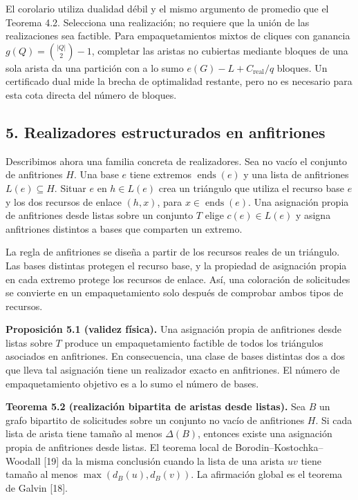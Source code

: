 \documentclass[spanish,11pt,a4paper]{article}
\begin{document}
El corolario utiliza dualidad débil y el mismo argumento de promedio que
el Teorema 4.2. Selecciona una realización; no requiere que la unión de
las realizaciones sea factible. Para empaquetamientos mixtos de cliques
con ganancia \(g(Q)=\binom{|Q|}{2}-1\), completar las aristas no
cubiertas mediante bloques de una sola arista da una partición con a lo
sumo \(e(G)-L+C_{\mathrm{real}}/q\) bloques. Un certificado dual mide la
brecha de optimalidad restante, pero no es necesario para esta cota
directa del número de bloques.

\subsection{5. Realizadores estructurados en
anfitriones}\label{realizadores-estructurados-en-anfitriones}

Describimos ahora una familia concreta de realizadores. Sea no vacío el
conjunto de anfitriones \(H\). Una base \(e\) tiene extremos
\(\operatorname{ends}(e)\) y una lista de anfitriones
\(L(e)\subseteq H\). Situar \(e\) en \(h\in L(e)\) crea un triángulo que
utiliza el recurso base \(e\) y los dos recursos de enlace \((h,x)\),
para \(x\in\operatorname{ends}(e)\). Una asignación propia de
anfitriones desde listas sobre un conjunto \(T\) elige \(c(e)\in L(e)\)
y asigna anfitriones distintos a bases que comparten un extremo.

La regla de anfitriones se diseña a partir de los recursos reales de un
triángulo. Las bases distintas protegen el recurso base, y la propiedad
de asignación propia en cada extremo protege los recursos de enlace.
Así, una coloración de solicitudes se convierte en un empaquetamiento
solo después de comprobar ambos tipos de recursos.

\textbf{Proposición 5.1 (validez física).} Una asignación propia de
anfitriones desde listas sobre \(T\) produce un empaquetamiento factible
de todos los triángulos asociados en anfitriones. En consecuencia, una
clase de bases distintas dos a dos que lleva tal asignación tiene un
realizador exacto en anfitriones. El número de empaquetamiento objetivo
es a lo sumo el número de bases.

\textbf{Teorema 5.2 (realización bipartita de aristas desde listas).}
Sea \(B\) un grafo bipartito de solicitudes sobre un conjunto no vacío
de anfitriones \(H\). Si cada lista de arista tiene tamaño al menos
\(\Delta(B)\), entonces existe una asignación propia de anfitriones
desde listas. El teorema local de Borodin--Kostochka--Woodall {[}19{]}
da la misma conclusión cuando la lista de una arista \(uv\) tiene tamaño
al menos \(\max(d_B(u),d_B(v))\). La afirmación global es el teorema de
Galvin {[}18{]}.
\end{document}
